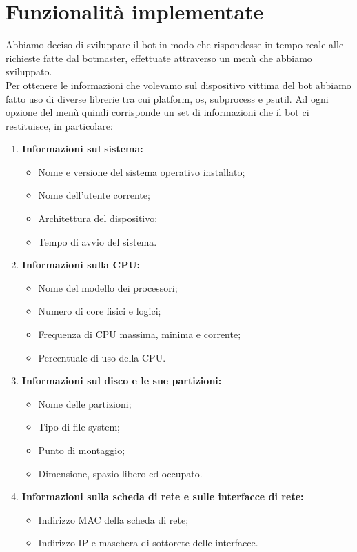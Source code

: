 \documentclass[a4paper]{report}
\begin{document}
\section{Funzionalità implementate}
Abbiamo deciso di sviluppare il bot in modo che rispondesse in tempo reale alle richieste fatte dal botmaster, effettuate attraverso un menù che abbiamo sviluppato.\\
Per ottenere le informazioni che volevamo sul dispositivo vittima del bot abbiamo fatto uso di diverse librerie tra cui platform, os, subprocess e psutil.
Ad ogni opzione del menù quindi corrisponde un set di informazioni che il bot ci restituisce, in particolare:
\\
\begin{enumerate}
	
	\item \textbf{Informazioni sul sistema:}
	\begin{itemize}
		\item Nome e versione del sistema operativo installato;
		\item Nome dell'utente corrente;
		\item Architettura del dispositivo;
		\item Tempo di avvio del sistema.
	\end{itemize}
	
	\item \textbf{Informazioni sulla CPU:}
	\begin{itemize}
		\item Nome del modello dei processori;
		\item Numero di core fisici e logici;
		\item Frequenza di CPU massima, minima e corrente;
		\item Percentuale di uso della CPU.
	\end{itemize}
	
	\item \textbf{Informazioni sul disco e le sue partizioni:}
	\begin{itemize}
		\item Nome delle partizioni;
		\item Tipo di file system;
		\item Punto di montaggio;
		\item Dimensione, spazio libero ed occupato.
	\end{itemize}
	
	\item \textbf{Informazioni sulla scheda di rete e sulle interfacce di rete:}
	\begin{itemize}
		\item Indirizzo MAC della scheda di rete;
		\item Indirizzo IP e maschera di sottorete delle interfacce.
	\end{itemize}
	

\end{enumerate}
\end{document}
